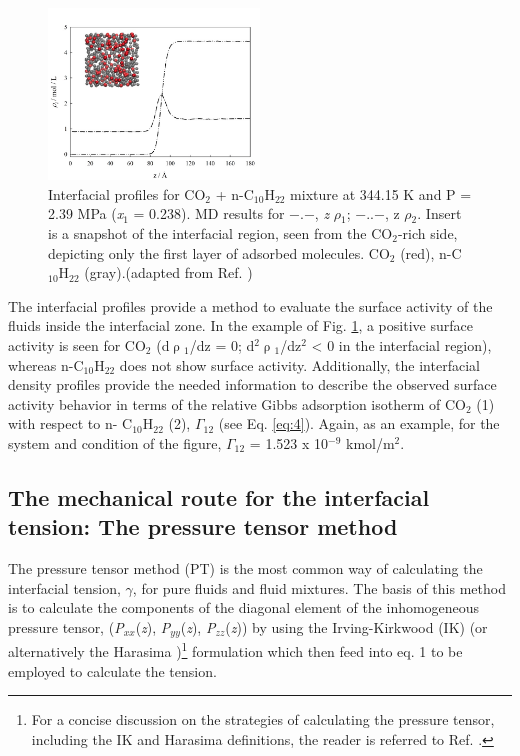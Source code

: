 \documentclass[9pt,bestpractices]{livecoms}
\begin{document}
\begin{figure}
\includegraphics[width=0.5\textwidth]{gfx/image54.jpeg}
\caption{Interfacial profiles for CO$_{2}$ + n-C$_{10}$H$_{22}$ mixture at 344.15 K and P = 2.39 MPa (\textit{x}$_{1}$ = 0.238). MD results for ${-}$.${-}$, \textit{z} \textendash{} ${\rho}$$_{1}$; ${-}$..${-}$, z\textendash{} ${\rho}$$_{2}$. Insert is a snapshot of the interfacial region, seen from the CO$_{2}$-rich side, depicting only the first layer of adsorbed molecules. CO$_{2}$ (red), n-C$_{10}$H$_{22}$ (gray).(adapted from Ref. \citep{mejia2014a})}
\label{fig:9}
\end{figure}

The interfacial profiles provide a method to evaluate the surface activity of
the fluids inside the interfacial zone. In the example of Fig. \ref{fig:9}, a positive
surface activity is seen for CO$_{2}$ (d${\uprho}$$_{1}$/dz = 0;
d$^{2}$${\uprho}$$_{1}$/dz$^{2}$ {\textless} 0 in the interfacial region),
whereas n-C$_{10}$H$_{22}$ does not show surface activity. Additionally, the
interfacial density profiles provide the needed information to describe the
observed surface activity behavior in terms of the relative Gibbs adsorption
isotherm of CO$_{2}$ (1) with respect to n- C$_{10}$H$_{22}$ (2),
${\Gamma}$$_{12}$ (see Eq. \ref{eq:4}). Again, as an example, for the system and
condition of the figure, ${\Gamma}$$_{12}$ = 1.523 x 10$^{-9}$
kmol/m$^{2}$\citep{mejia2014a}.

\subsection{The mechanical route for the interfacial tension: The pressure tensor method}

The pressure tensor method (PT) is the most common way of calculating the
interfacial tension, {${\gamma}$}, for pure fluids and fluid mixtures. The
basis of this method is to calculate the components of the diagonal element of
the inhomogeneous pressure tensor, (\textit{P}$_{xx}$(\textit{z}),
\textit{P}$_{yy}$(\textit{z}), \textit{P}$_{zz}$(\textit{z})) by using the
Irving-Kirkwood (IK) \citep{irving1950}
(or alternatively the Harasima \citep{harasima1957})\footnote{For
a concise discussion on the strategies of calculating the pressure tensor,
including the IK and Harasima definitions, the reader is referred to Ref. \citep{long2013}.
}
formulation which
then feed into eq. 1 to be employed to calculate the tension. 
\end{document}
